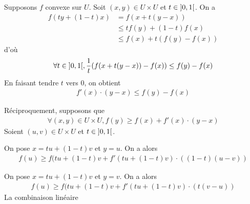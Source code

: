 \documentclass[french,a4paper,10pt]{article}
\begin{document}
	\begin{myproof}
		Supposons $f$ convexe sur $U$. Soit $(x,y)\in U\times U$ et $t\in\mathopen{]}0, 1\mathclose{[}$. On a
			\[\begin{aligned}
				f(ty+(1-t)x)&=f(x+t(y-x))\\
				&\le tf(y)+(1-t)f(x)\\
				&\le f(x)+t(f(y)-f(x))
			\end{aligned}\]
		d'où
			\[\begin{aligned}
				\forall t\in\mathopen{]}0, 1\mathclose{[},\frac1t(f(x+t(y-x))-f(x))\le f(y)-f(x)
			\end{aligned}\]
		En faisant tendre $t$ vers 0, on obtient
			\[\begin{aligned}
				f'(x)\cdot(y-x)\le f(y)-f(x)
			\end{aligned}\]
			
		Réciproquement, supposons que
			\[\begin{aligned}
				\forall (x,y)\in U\times U,f(y)\ge f(x)+f'(x)\cdot(y-x)
			\end{aligned}\]
		Soient $(u,v)\in U\times U$ et $t\in\mathopen{]}0,1\mathclose{[}$.
		
		On pose $x=tu+(1-t)v$ et $y=u$. On a alors
			\[
			\begin{aligned}\label{eq1}
				f(u)\ge f(tu+(1-t)v+f'(tu+(1-t)v)\cdot((1-t)(u-v))
			\end{aligned}\]
			
		On pose $x=tu+(1-t)v$ et $y=v$. On a alors
			\[
			\begin{aligned}\label{eq2}
				f(u)\ge f(tu+(1-t)v+f'(tu+(1-t)v)\cdot(t(v-u))
			\end{aligned}\]
		La combinaison linéaire
	\end{myproof}
\end{document}
